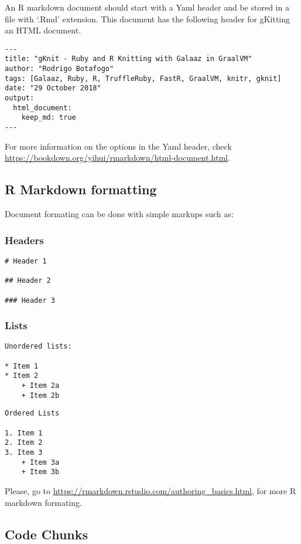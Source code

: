 \documentclass[]{article}
\begin{document}
An R markdown document should start with a Yaml header and be stored in
a file with `.Rmd' extension. This document has the following header for
gKitting an HTML document.

\begin{verbatim}
---
title: "gKnit - Ruby and R Knitting with Galaaz in GraalVM"
author: "Rodrigo Botafogo"
tags: [Galaaz, Ruby, R, TruffleRuby, FastR, GraalVM, knitr, gknit]
date: "29 October 2018"
output:
  html_document:
    keep_md: true
---
\end{verbatim}

For more information on the options in the Yaml header, check
\url{https://bookdown.org/yihui/rmarkdown/html-document.html}.

\subsection{R Markdown formatting}\label{r-markdown-formatting}

Document formating can be done with simple markups such as:

\subsubsection{Headers}\label{headers}

\begin{verbatim}
# Header 1

## Header 2

### Header 3
\end{verbatim}

\subsubsection{Lists}\label{lists}

\begin{verbatim}
Unordered lists:

* Item 1
* Item 2
    + Item 2a
    + Item 2b
\end{verbatim}

\begin{verbatim}
Ordered Lists

1. Item 1
2. Item 2
3. Item 3
    + Item 3a
    + Item 3b
\end{verbatim}

Please, go to \url{https://rmarkdown.rstudio.com/authoring_basics.html},
for more R markdown formating.

\subsection{Code Chunks}\label{code-chunks}
\end{document}

